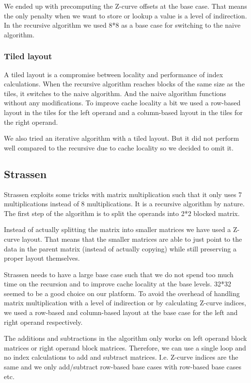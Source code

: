 We ended up with precomputing the Z-curve offsets at the base case. That means the only penalty when we want to store or lookup a value is a level of indirection. In the recursive algorithm we used 8*8 as a base case for switching to the naive algorithm.

\subsubsection{Tiled layout}

A tiled layout is a compromise between locality and performance of index calculations. When the recursive algorithm reaches blocks of the same size as the tiles, it switches to the naive algorithm. And the naive algorithm functions without any modifications. To improve cache locality a bit we used a row-based layout in the tiles for the left operand and a column-based layout in the tiles for the right operand.

We also tried an iterative algorithm with a tiled layout. But it did not perform well compared to the recursive due to cache locality so we decided to omit it.

\subsection{Strassen}

Strassen exploits some tricks with matrix multiplication such that it only uses 7 multiplications instead of 8 multiplications. It is a recursive algorithm by nature. The first step of the algorithm is to split the operands into 2*2 blocked matrix.

Instead of actually splitting the matrix into smaller matrices we have used a Z-curve layout. That means that the smaller matrices are able to just point to the data in the parent matrix (instead of actually copying) while still preserving a proper layout themselves.

Strassen needs to have a large base case such that we do not spend too much time on the recursion and to improve cache locality at the base levels. 32*32 seemed to be a good choice on our platform. To avoid the overhead of handling matrix multiplication with a level of indirection or by calculating Z-curve indices, we used a row-based and column-based layout at the base case for the left and right operand respectively.

The additions and subtractions in the algorithm only works on left operand block matrices or right operand block matrices. Therefore, we can use a single loop and no index calculations to add and subtract matrices. I.e. Z-curve indices are the same and we only add/subtract row-based base cases with row-based base cases etc.

